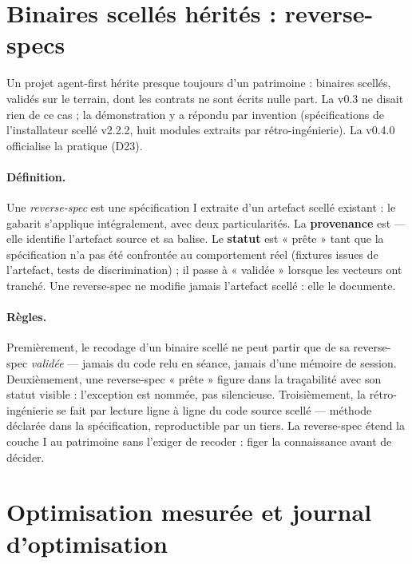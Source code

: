 \section{Binaires scellés hérités : reverse-specs}\label{sec:reversespecs}

Un projet agent-first hérite presque toujours d’un patrimoine : binaires scellés, validés
sur le terrain, dont les contrats ne sont écrits nulle part. La v0.3 ne disait rien de ce
cas ; la démonstration y a répondu par invention (spécifications de l’installateur scellé
v2.2.2, huit modules extraits par rétro-ingénierie). La v0.4.0 officialise la pratique
(D23).

\begin{sloppypar}
\paragraph{Définition.} Une \emph{reverse-spec} est une spécification I extraite d’un
artefact scellé existant : le gabarit s’applique intégralement, avec deux particularités.
La \textbf{provenance} est  — elle identifie
l’artefact source et sa balise. Le \textbf{statut} est « prête » tant que la spécification
n’a pas été confrontée au comportement réel (fixtures issues de l’artefact, tests de
discrimination) ; il passe à « validée » lorsque les vecteurs ont tranché. Une
reverse-spec ne modifie jamais l’artefact scellé : elle le documente.
\end{sloppypar}

\paragraph{Règles.} Premièrement, le recodage d’un binaire scellé ne peut partir que de sa
reverse-spec \emph{validée} — jamais du code relu en séance, jamais d’une mémoire de
session. Deuxièmement, une reverse-spec « prête » figure dans la traçabilité avec son
statut visible : l’exception est nommée, pas silencieuse. Troisièmement, la
rétro-ingénierie se fait par lecture ligne à ligne du code source scellé — méthode
déclarée dans la spécification, reproductible par un tiers. La reverse-spec étend la
couche I au patrimoine sans l’exiger de recoder : figer la connaissance avant de décider.

\section{Optimisation mesurée et journal d’optimisation}\label{sec:optimisation}

